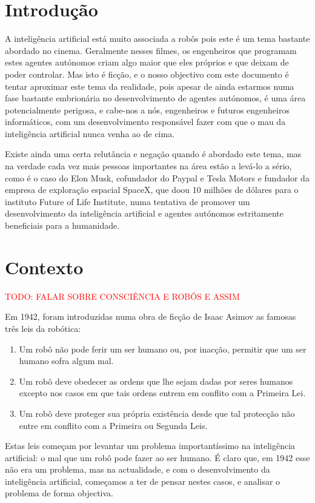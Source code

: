 \documentclass[runningheads,a4paper]{llncs}
\begin{document}
\section{Introdução}

A inteligência artificial está muito associada a robôs pois este é um tema bastante abordado no cinema. Geralmente nesses filmes, os engenheiros que programam estes agentes autónomos criam algo maior que eles próprios e que deixam de poder controlar. Mas isto é ficção, e o nosso objectivo com este documento é tentar aproximar este tema da realidade, pois apesar de ainda estarmos numa fase bastante embrionária no desenvolvimento de agentes autónomos, é uma área potencialmente perigosa, e cabe-nos a nós, engenheiros e futuros engenheiros informáticos, com um desenvolvimento responsável fazer com que o mau da inteligência artificial nunca venha ao de cima.

Existe ainda uma certa relutância e negação quando é abordado este tema, mas na verdade cada vez mais pessoas importantes na área estão a levá-lo a sério, como é o caso do Elon Musk, cofundador do Paypal e Tesla Motors e fundador da empresa de exploração espacial SpaceX, que doou 10 milhões de dólares para o instituto Future of Life Institute, numa tentativa de promover um desenvolvimento da inteligência artificial e agentes autónomos estritamente beneficiais para a humanidade.

\section{Contexto}

\textcolor{red}{TODO: FALAR SOBRE CONSCIÊNCIA E ROBÔS E ASSIM}

Em 1942, foram introduzidas numa obra de ficção de Isaac Asimov as famosas três leis da robótica:

\begin{enumerate}
    \item Um robô não pode ferir um ser humano ou, por inacção, permitir que um ser humano sofra algum mal.
    \item Um robô deve obedecer as ordens que lhe sejam dadas por seres humanos excepto nos casos em que tais ordens entrem em conflito com a Primeira Lei.
    \item Um robô deve proteger sua própria existência desde que tal protecção não entre em conflito com a Primeira ou Segunda Leis.
\end{enumerate}

Estas leis começam por levantar um problema importantíssimo na inteligência artificial: o mal que um robô pode fazer ao ser humano. É claro que, em 1942 esse não era um problema, mas na actualidade, e com o desenvolvimento da inteligência artificial, começamos a ter de pensar nestes casos, e analisar o problema de forma objectiva.
\end{document}
